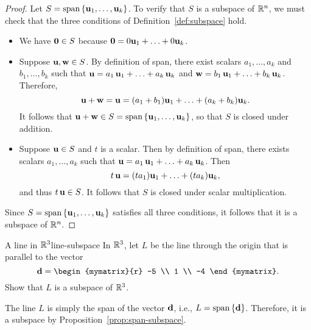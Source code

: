 \begin{proof}
  Let $S=\sspan\set{\vect{u}_1,\ldots,\vect{u}_k}$. To verify that $S$
  is a subspace of\/ $\mathbb{R}^{n}$, we must check that the three conditions
  of Definition~\ref{def:subspace} hold.
  \begin{itemize}
  \item We have $\mbox{\bf 0}\in S$ because
    $\mbox{\bf 0}=0\mbox{\bf u}_1+\ldots+0\mbox{\bf u}_k$.
  \item Suppose $\mbox{\bf u},\mbox{\bf w}\in S$.
    By definition of span, there exist scalars $a_1,\ldots,a_k$ and
    $b_1,\ldots,b_k$ such that
    $\mbox{\bf u}=a_1\,\mbox{\bf u}_1+\ldots+a_k\,\mbox{\bf u}_k$ and
    $\mbox{\bf w}=b_1\,\mbox{\bf u}_1+\ldots+b_k\,\mbox{\bf u}_k$.
    Therefore,
    \begin{equation*}
      \mbox{\bf u}+\mbox{\bf w} = \mbox{\bf u}=(a_1+b_1)\mbox{\bf u}_1+\ldots+(a_k+b_k)\mbox{\bf u}_k.
    \end{equation*}
    It follows that
    $\vect{u}+\vect{w}\in S=\sspan\set{\vect{u}_1,\ldots,\vect{u}_k}$,
    so that $S$ is closed under addition.
  \item Suppose $\mbox{\bf u}\in S$ and $t$ is a scalar. Then by
    definition of span, there exists scalars $a_1,\ldots,a_k$ such
    that $\mbox{\bf u}=a_1\,\mbox{\bf u}_1+\ldots+a_k\,\mbox{\bf u}_k$. Then
    \begin{equation*}
      t\,\mbox{\bf u}=(ta_1)\mbox{\bf u}_1+\ldots+(ta_k)\mbox{\bf u}_k,
    \end{equation*}
    and thus $t\,\mbox{\bf u}\in S$. It follows that $S$ is closed under
    scalar multiplication.
  \end{itemize}
  Since $S=\sspan\set{\vect{u}_1,\ldots,\vect{u}_k}$ satisfies all
  three conditions, it follows that it is a subspace of\/ $\mathbb{R}^n$.
\end{proof}

\begin{example}{A line in $\mathbb{R}^3$}{line-subspace}
  In $\mathbb{R}^3$, let $L$ be the line through the origin that is
  parallel to the vector
  \begin{equation*}
    {\vect{d}}= \begin{mymatrix}{r} -5 \\ 1 \\ -4 \end{mymatrix}.
  \end{equation*}
  Show that $L$ is a subspace of\/ $\mathbb{R}^3$.
\end{example}

\begin{solution}
  The line $L$ is simply the span of the vector $\mbox{\bf d}$, i.e.,
  $L=\sspan\set{\vect{d}}$. Therefore, it is a subspace by
  Proposition~\ref{prop:span-subspace}.
\end{solution}

